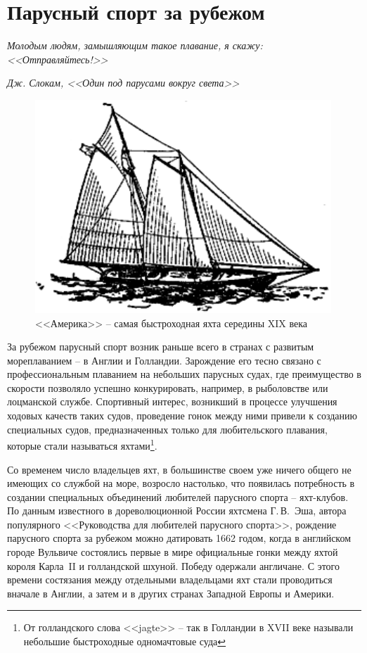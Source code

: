\documentclass[a4paper, 12pt, twoside, final]{scrbook}
\begin{document}
\section{Парусный спорт за рубежом}
\epigraph{\emph{Молодым людям, замышляющим такое плавание, я скажу: <<Отправляйтесь!>>}}{\emph{Дж. Слокам, <<Один под парусами вокруг света>>}}

\begin{figure}
\centering\includegraphics{Amerika}
\protect\caption{<<Америка>> \--- самая быстроходная яхта середины XIX века}
\end{figure}

За рубежом парусный спорт возник раньше всего в странах с развитым
мореплаванием \--- в Англии и Голландии. Зарождение его тесно связано
с профессиональным плаванием на небольших парусных судах, где преимущество
в скорости позволяло успешно конкурировать, например, в рыболовстве
или лоцманской службе. Спортивный интерес, возникший в процессе улучшения
ходовых качеств таких судов, проведение гонок между ними привели к
созданию специальных судов, предназначенных только для любительского
плавания, которые стали называться яхтами\footnote{От голландского слова <<jagte>> \--- так в Голландии в XVII веке называли
небольшие быстроходные одномачтовые суда}.

Со временем число владельцев яхт, в большинстве своем уже ничего общего
не имеющих со службой на море, возросло настолько, что появилась потребность
в создании специальных объединений любителей парусного спорта \--- яхт-клубов.
По данным известного в дореволюционной России яхтсмена Г.\,В.~Эша,
автора популярного <<Руководства для любителей парусного спорта>>, рождение
парусного спорта за рубежом можно датировать 1662 годом, когда в английском
городе Вульвиче состоялись первые в мире официальные гонки между яхтой
короля Карла~II и голландской шхуной. Победу одержали англичане. С
этого времени состязания между отдельными владельцами яхт стали проводиться
вначале в Англии, а затем и в других странах Западной Европы и Америки.
\end{document}
